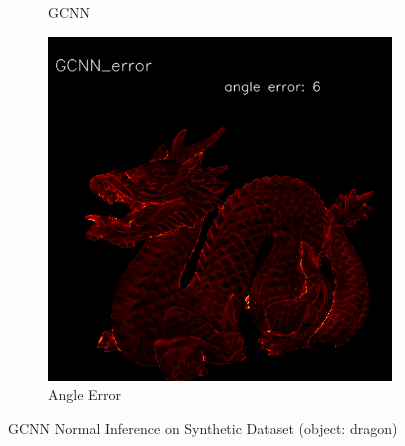 \begin{figure}[h!]
\begin{subfigure}[b]{0.24\linewidth}
		\caption{GCNN}
	\end{subfigure}
	\begin{subfigure}[b]{0.24\linewidth}
		\includegraphics[width=\linewidth]{./Figures/gcnn-synthetic/fancy_eval_3_error_GCNN.png}
		\caption{Angle Error}
	\end{subfigure}
	\caption{GCNN Normal Inference on Synthetic Dataset (object: dragon)}
	\label{fig:gcnn-eval-synthetic}
\end{figure}


